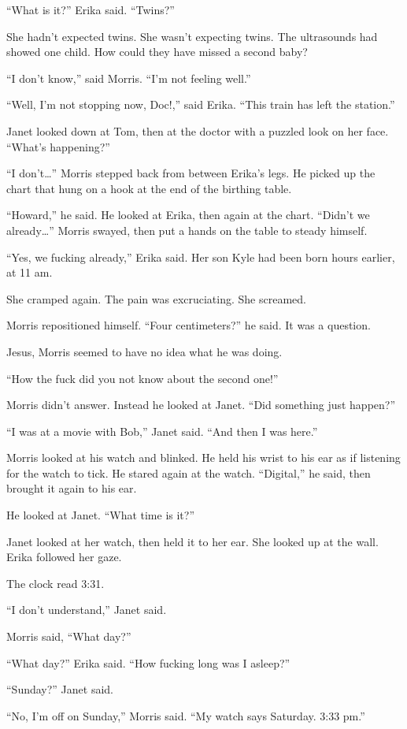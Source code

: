“What is it?” Erika said. “Twins?”

She hadn’t expected twins. She wasn’t expecting twins. The ultrasounds had showed one child. How could they have missed a second baby?

“I don’t know,” said Morris. “I’m not feeling well.”

“Well, I’m not stopping now, Doc!,” said Erika. “This train has left the station.”

Janet looked down at Tom, then at the doctor with a puzzled look on her face. “What’s happening?”

“I don’t…” Morris stepped back from between Erika’s legs. He picked up the chart that hung on a hook at the end of the birthing table.

“Howard,” he said. He looked at Erika, then again at the chart. “Didn’t we already…” Morris swayed, then put a hands on the table to steady himself.

“Yes, we fucking already,” Erika said. Her son Kyle had been born hours earlier, at 11 am.

She cramped again. The pain was excruciating. She screamed.

Morris repositioned himself. “Four centimeters?” he said. It was a question.

Jesus, Morris seemed to have no idea what he was doing.

“How the fuck did you not know about the second one!”

Morris didn’t answer. Instead he looked at Janet. “Did something just happen?”

“I was at a movie with Bob,” Janet said. “And then I was here.”

Morris looked at his watch and blinked. He held his wrist to his ear as if listening for the watch to tick. He stared again at the watch. “Digital,” he said, then brought it again to his ear.

He looked at Janet. “What time is it?”

Janet looked at her watch, then held it to her ear. She looked up at the wall. Erika followed her gaze.

The clock read 3:31.

“I don’t understand,” Janet said.

Morris said, “What day?”

“What day?” Erika said. “How fucking long was I asleep?”

“Sunday?” Janet said.

“No, I’m off on Sunday,” Morris said. “My watch says Saturday. 3:33 pm.”

